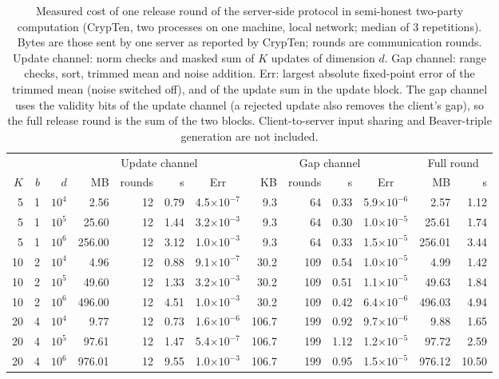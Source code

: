\begin{table}[tbp]
\centering
\footnotesize
\setlength{\tabcolsep}{4pt}
\caption{Measured cost of one release round of the server-side protocol in semi-honest two-party computation (CrypTen, two processes on one machine, local network; median of 3 repetitions). Bytes are those sent by one server as reported by CrypTen; rounds are communication rounds. Update channel: norm checks and masked sum of $K$ updates of dimension $d$. Gap channel: range checks, sort, trimmed mean and noise addition. Err: largest absolute fixed-point error of the trimmed mean (noise switched off), and of the update sum in the update block. The gap channel uses the validity bits of the update channel (a rejected update also removes the client's gap), so the full release round is the sum of the two blocks. Client-to-server input sharing and Beaver-triple generation are not included.}
\label{tab:mpc}
\begin{adjustbox}{max width=\textwidth}
\begin{tabular}{rrr rrrc rrrc rr}
\toprule
 & & & \multicolumn{4}{c}{Update channel} & \multicolumn{4}{c}{Gap channel} & \multicolumn{2}{c}{Full round} \\
$K$ & $b$ & $d$ & MB & rounds & s & Err & KB & rounds & s & Err & MB & s \\
\midrule
5 & 1 & $10^{4}$ & 2.56 & 12 & 0.79 & 4.5$\times10^{-7}$ & 9.3 & 64 & 0.33 & 5.9$\times10^{-6}$ & 2.57 & 1.12 \\
5 & 1 & $10^{5}$ & 25.60 & 12 & 1.44 & 3.2$\times10^{-3}$ & 9.3 & 64 & 0.30 & 1.0$\times10^{-5}$ & 25.61 & 1.74 \\
5 & 1 & $10^{6}$ & 256.00 & 12 & 3.12 & 1.0$\times10^{-3}$ & 9.3 & 64 & 0.33 & 1.5$\times10^{-5}$ & 256.01 & 3.44 \\
10 & 2 & $10^{4}$ & 4.96 & 12 & 0.88 & 9.1$\times10^{-7}$ & 30.2 & 109 & 0.54 & 1.0$\times10^{-5}$ & 4.99 & 1.42 \\
10 & 2 & $10^{5}$ & 49.60 & 12 & 1.33 & 3.2$\times10^{-3}$ & 30.2 & 109 & 0.51 & 1.1$\times10^{-5}$ & 49.63 & 1.84 \\
10 & 2 & $10^{6}$ & 496.00 & 12 & 4.51 & 1.0$\times10^{-3}$ & 30.2 & 109 & 0.42 & 6.4$\times10^{-6}$ & 496.03 & 4.94 \\
20 & 4 & $10^{4}$ & 9.77 & 12 & 0.73 & 1.6$\times10^{-6}$ & 106.7 & 199 & 0.92 & 9.7$\times10^{-6}$ & 9.88 & 1.65 \\
20 & 4 & $10^{5}$ & 97.61 & 12 & 1.47 & 5.4$\times10^{-7}$ & 106.7 & 199 & 1.12 & 1.2$\times10^{-5}$ & 97.72 & 2.59 \\
20 & 4 & $10^{6}$ & 976.01 & 12 & 9.55 & 1.0$\times10^{-3}$ & 106.7 & 199 & 0.95 & 1.5$\times10^{-5}$ & 976.12 & 10.50 \\
\bottomrule
\end{tabular}
\end{adjustbox}
\end{table}
